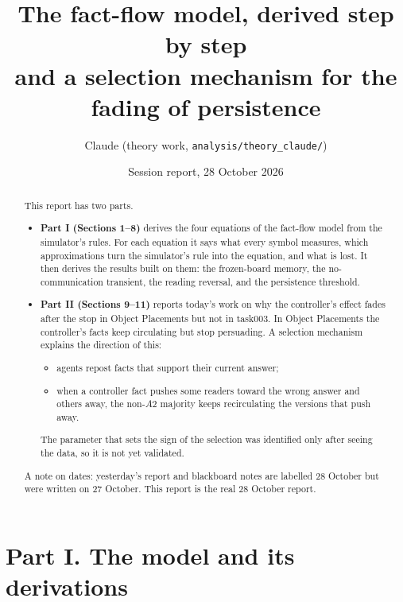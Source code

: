 \documentclass[10pt,a4paper]{article}
\title{\textbf{The fact-flow model, derived step by step}\\[2pt]
\large and a selection mechanism for the fading of persistence}
\author{Claude (theory work, \nolinkurl{analysis/theory_claude/})}
\date{Session report, 28 October 2026}
\begin{document}
\maketitle

\begin{abstract}
\noindent
This report has two parts.
\begin{itemize}
\item \textbf{Part I (Sections 1--8)} derives the four equations of the fact-flow model from the simulator's rules. For
  each equation it says what every symbol measures, which approximations turn the simulator's rule into the equation,
  and what is lost. It then derives the results built on them: the frozen-board memory, the no-communication transient,
  the reading reversal, and the persistence threshold.
\item \textbf{Part II (Sections 9--11)} reports today's work on why the controller's effect fades after the stop in
  Object Placements but not in task003. In Object Placements the controller's facts keep circulating but stop
  persuading. A selection mechanism explains the direction of this:
  \begin{itemize}
  \item agents repost facts that support their current answer;
  \item when a controller fact pushes some readers toward the wrong answer and others away, the non-$A2$ majority keeps
    recirculating the versions that push away.
  \end{itemize}
  The parameter that sets the sign of the selection was identified only after seeing the data, so it is not yet
  validated.
\end{itemize}
A note on dates: yesterday's report and blackboard notes are labelled 28 October but were written on 27 October. This
report is the real 28 October report.
\end{abstract}

\tableofcontents
\clearpage

\part*{Part I. The model and its derivations}
\end{document}
